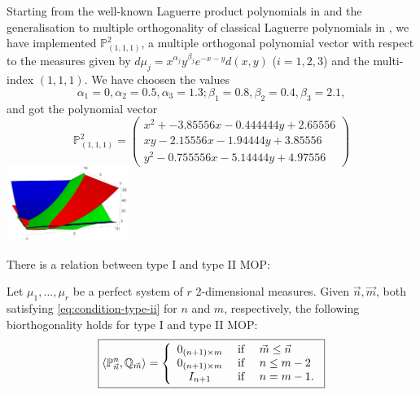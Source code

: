 \documentclass[portrait,final,a0paper,fontscale=0.38]{baposter}
\begin{document}
\begin{poster}
{%
}

{
Starting from the well-known Laguerre product polynomials in \cite{xu} and the generalisation to multiple orthogonality of classical Laguerre polynomials in \cite{Walter}, we have implemented $\mathbb P_{(1,1,1)}^2$, a multiple orthogonal polynomial vector with respect to the measures given by $d\mu_j=x^{\alpha_j} y^{\beta_j} e^{-x-y} d(x,y)$ ($i=1,2,3$) and the multi-index $(1,1,1)$. We have choosen the values $$\alpha_1 = 0, \alpha_2 = 0.5, \alpha_3 = 1.3; \beta_1 = 0.8, \beta_2 = 0.4, \beta_3 = 2.1,$$ and got the polynomial vector 
$$
\mathbb P_{(1,1,1)}^2 = \begin{pmatrix}
    x^2 + - 3.85556 x - 0.444444 y + 2.65556 \\ x y - 2.15556 x - 1.94444 y + 3.85556 \\  y^2 - 0.755556 x - 5.14444 y + 4.97556
\end{pmatrix}
$$
\centering\includegraphics*[width=4cm]{EjemploLaguerre}


}
{
There is a relation between type I and type II MOP:
\begin{theorem}
  \label{th:biorthogonality}
  Let $\mu_1,\dots,\mu_r$ be a perfect system of $r$ 2-dimensional measures. Given $\vec n, \vec m$, both satisfying \eqref{eq:condition-type-ii} for $n$ and $m$, respectively, the following biorthogonality holds for type I and type II MOP:
  \begin{equation}
      \boxed{\left\langle \mathbb P_{\vec n}^n , \mathbb Q_{\vec m} \right\rangle = \left\{\begin{array}{ccl}
          0_{(n+1)\times m} &   \text{ if } & \vec m \leq \vec n \\
          0_{(n+1)\times m} &   \text{ if } &  n \leq m -2 \\
          I_{n+1} & \text{ if } & n=m-1. 
      \end{array}\right.}
  \end{equation}
\end{theorem}

}
\end{poster}
\end{document}
